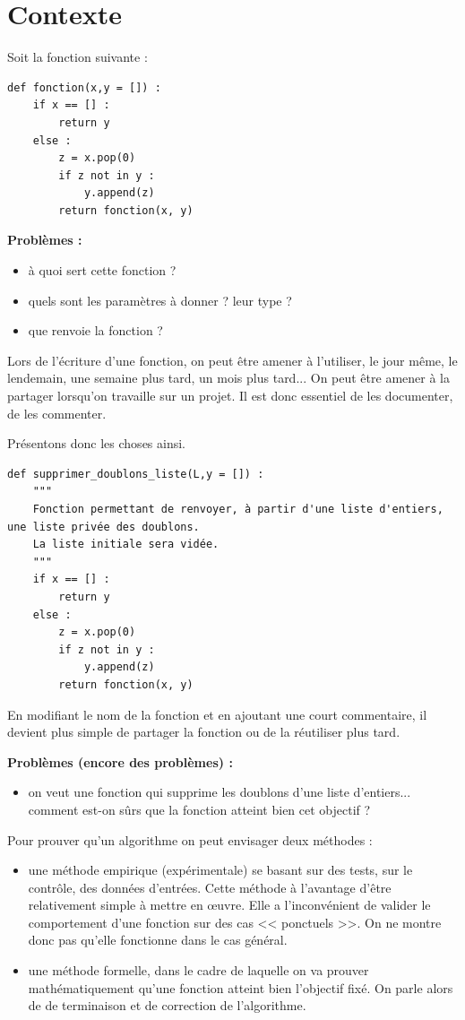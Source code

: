 \section{Contexte}
Soit la fonction suivante : 
\begin{lstlisting}
def fonction(x,y = []) :
    if x == [] : 
        return y
    else : 
        z = x.pop(0)
        if z not in y : 
            y.append(z)
        return fonction(x, y)
\end{lstlisting}

\textbf{Problèmes :}
\begin{itemize}
\item à quoi sert cette fonction ?
\item quels sont les paramètres à donner ? leur type ?
\item que renvoie la fonction ?
\end{itemize}

Lors de l'écriture d'une fonction, on peut être amener à l'utiliser, le jour même, le lendemain, une semaine plus tard, un mois plus tard... On peut être amener à la partager lorsqu'on travaille sur un projet. 
Il est donc essentiel de les documenter, de les commenter.

Présentons donc les choses ainsi. 

\begin{lstlisting}
def supprimer_doublons_liste(L,y = []) :
    """
    Fonction permettant de renvoyer, à partir d'une liste d'entiers, une liste privée des doublons. 
    La liste initiale sera vidée. 
    """
    if x == [] : 
        return y
    else : 
        z = x.pop(0)
        if z not in y : 
            y.append(z)
        return fonction(x, y)
\end{lstlisting}

En modifiant le nom de la fonction et en ajoutant une court commentaire, il devient plus simple de partager la fonction ou de la réutiliser plus tard. 

\textbf{Problèmes (encore des problèmes) :}
\begin{itemize}
\item on veut une fonction qui supprime les doublons d'une liste d'entiers... comment est-on sûrs que la fonction atteint bien cet objectif ?
\end{itemize}
 
Pour prouver qu'un algorithme on peut envisager deux méthodes : 
\begin{itemize}
\item une méthode empirique (expérimentale) se basant sur des tests, sur le contrôle, des données d'entrées. Cette méthode à l'avantage d'être relativement simple à mettre en \oe{}uvre. Elle a l'inconvénient de valider le comportement d'une fonction sur des cas << ponctuels >>. On ne montre donc pas qu'elle fonctionne dans le cas général. 
\item une méthode formelle, dans le cadre de laquelle on va prouver mathématiquement qu'une fonction atteint bien l'objectif fixé. On parle alors de de terminaison et de correction de l'algorithme.
\end{itemize}

